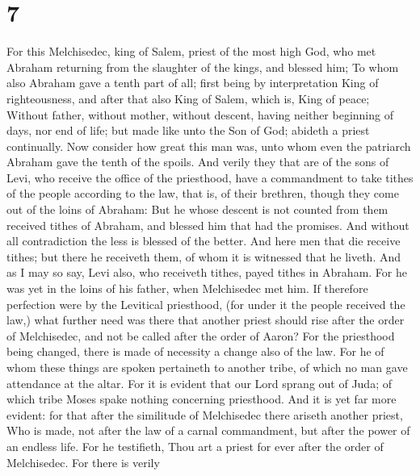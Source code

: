 \hypertarget{section-6}{%
\section{7}\label{section-6}}

 For this Melchisedec, king of Salem, priest of the most
high God, who met Abraham returning from the slaughter of the kings, and
blessed him;  To whom also Abraham gave a tenth part of
all; first being by interpretation King of righteousness, and after that
also King of Salem, which is, King of peace;  Without
father, without mother, without descent, having neither beginning of
days, nor end of life; but made like unto the Son of God; abideth a
priest continually.  Now consider how great this man was,
unto whom even the patriarch Abraham gave the tenth of the spoils.
 And verily they that are of the sons of Levi, who receive
the office of the priesthood, have a commandment to take tithes of the
people according to the law, that is, of their brethren, though they
come out of the loins of Abraham:  But he whose descent is
not counted from them received tithes of Abraham, and blessed him that
had the promises.  And without all contradiction the less
is blessed of the better.  And here men that die receive
tithes; but there he receiveth them, of whom it is witnessed that he
liveth.  And as I may so say, Levi also, who receiveth
tithes, payed tithes in Abraham.  For he was yet in the
loins of his father, when Melchisedec met him.  If
therefore perfection were by the Levitical priesthood, (for under it the
people received the law,) what further need was there that another
priest should rise after the order of Melchisedec, and not be called
after the order of Aaron?  For the priesthood being
changed, there is made of necessity a change also of the law.
 For he of whom these things are spoken pertaineth to
another tribe, of which no man gave attendance at the altar.
 For it is evident that our Lord sprang out of Juda; of
which tribe Moses spake nothing concerning priesthood. 
And it is yet far more evident: for that after the similitude of
Melchisedec there ariseth another priest,  Who is made,
not after the law of a carnal commandment, but after the power of an
endless life.  For he testifieth, Thou art a priest for
ever after the order of Melchisedec.  For there is verily
